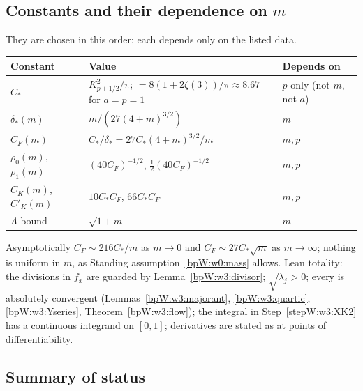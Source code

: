 \subsection{Constants and their dependence on \texorpdfstring{$m$}{m}}\label{bpW:w3:constants}

They are chosen in this order; each depends only on the listed data.
\begin{center}\small
\begin{tabular}{@{}lll@{}}
\toprule
Constant & Value & Depends on\\
\midrule
$C_*$ & $K_{p+1/2}^2/\pi$; $=8(1+2\zeta(3))/\pi\approx8.67$ for $a=p=1$ & $p$ only (not $m$, not $a$)\\
$\delta_*(m)$ & $m/(27(4+m)^{3/2})$ & $m$\\
$C_F(m)$ & $C_*/\delta_*=27C_*(4+m)^{3/2}/m$ & $m,p$\\
$\rho_0(m)$, $\rho_1(m)$ & $(40C_F)^{-1/2}$, $\frac12(40C_F)^{-1/2}$ & $m,p$\\
$C_K(m)$, $C'_K(m)$ & $10C_*C_F$, $66C_*C_F$ & $m,p$\\
$\Lambda$ bound & $\sqrt{1+m}$ & $m$\\
\bottomrule
\end{tabular}
\end{center}
Asymptotically $C_F\sim216C_*/m$ as $m\to0$ and $C_F\sim27C_*\sqrt m$ as $m\to\infty$; nothing is uniform in $m$, as
Standing assumption~\ref{bpW:w0:mass} allows. Lean totality: the divisions in $f_x$ are guarded by
Lemma~\ref{bpW:w3:divisor}; $\sqrt{\lambda_j}>0$; every  is absolutely convergent
(Lemmas~\ref{bpW:w3:majorant}, \ref{bpW:w3:quartic}, \ref{bpW:w3:Yseries}, Theorem~\ref{bpW:w3:flow}); the integral in
Step~\ref{stepW:w3:XK2} has a continuous integrand on $[0,1]$; derivatives are stated as  at points
of differentiability.

\subsection{Summary of status}\label{bpW:w3:status}

